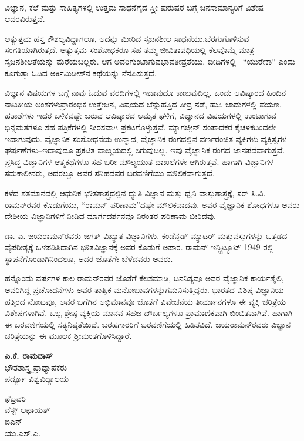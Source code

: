 \newpage

~
\thispagestyle{empty}

\vskip 1cm



\vskip 0.7cm


\noindent
ವಿಜ್ಞಾನ, ಕಲೆ ಮತ್ತು ಸಾಹಿತ್ಯಗಳಲ್ಲಿ ಉತ್ತಮ ಸಾಧನೆಗೈದ ಸ್ತ್ರೀ ಪುರುಷರ ಬಗ್ಗೆ ಜನಸಾಮಾನ್ಯರಿಗೆ ವಿಶೇಷ ಆದರವಿರುತ್ತದೆ.

ಅತ್ಯುತ್ತಮ ಹಸ್ತ ಕೌಶಲ್ಯವಿದ್ದಾಗಲೂ, ಅದನ್ನು ಮೀರಿದ ಸೃಜನಶೀಲ ಸಾಧನೆಯು,\break ಬೆರಗುಗೊಳಿಸುವ ಸಂಗತಿಯಾಗಿರುತ್ತದೆ. ಅತ್ಯುತ್ತಮ ಸಂಶೋಧಕರೂ ಸಹ ತಮ್ಮ ಜೀವಿತಾವಧಿಯಲ್ಲಿ ಕೆಲವೊಮ್ಮೆ ಮಾತ್ರ ಸೃಜನಶೀಲತೆಯನ್ನು ಮೆರೆಯಬಲ್ಲರು. ಆಗ ಅವರಿಗುಂಟಾಗುವ\break ಭಾವತೀವ್ರತೆಯು, ಬೀದಿಗಳಲ್ಲಿ ~“ಯುರೇಕಾ” ಎಂದು ಕೂಗುತ್ತಾ ಓಡಿದ ಅರ್ಕಿಮಿಡೀಸ್‍ನ ಕಥೆಯನ್ನು ನೆನಪಿಸುತ್ತದೆ.

ವಿಜ್ಞಾನ ವಿಷಯಗಳ ಬಗ್ಗೆ ನಾವು ಓದುವ ವರದಿಗಳಲ್ಲಿ ಇದಾವುದೂ ಕಾಣುವುದಿಲ್ಲ. ಒಂದು ಆವಿಷ್ಕಾರದ ಹಿಂದಿನ ನಾಟಕೀಯ ಅಂಶಗಳು\enginline{-}ಪ್ರಾರಂಭಿಕ ಉತ್ತೇಜನ, ವಿಷಯದ ಬೆನ್ನುಹತ್ತಿದ ತೀವ್ರ ನಡೆ, ಹುಸಿ ಜಾಡುಗಳಲ್ಲಿ ಪಯಣ, ಹತಾಶೆಗಳು ಇದರ ಬಳಿಕವಷ್ಟೇ ಬರುವ ಆವಿಷ್ಕಾರದ ಅಮೃತ ಘಳಿಗೆ, ವಿಜ್ಞಾನದ ವಿಷಯಗಳಲ್ಲಿ ಉಂಟಾಗುವ ಭಿನ್ನಮತಗಳೂ ಸಹ ಪತ್ರಿಕೆಗಳಲ್ಲಿ ನೀರಸವಾಗಿ ಪ್ರಕಟಗೊಳ್ಳುತ್ತವೆ. ಮ್ಯಾಗಜೀ಼ನ್ ಸಂಪಾದಕರ ಕೈಚಳಕದಿಂದಲೇ ಇದಾಗುವುದು. ವೈಜ್ಞಾನಿಕ ಸಂಶೋಧನೆಯ ಉನ್ಮಾದ, ವೈಜ್ಞಾನಿಕ ರಂಗದಲ್ಲಿನ ವರ್ಣರಂಜಿತ ವ್ಯಕ್ತಿಗಳು ವ್ಯಕ್ತಿತ್ವಗಳ ಘರ್ಷಣೆಗಳು–ಇದಾವುದೂ ಪ್ರಕಟಿತ ವಾಙ್ಮಯದಲ್ಲಿ ಸಿಗುವುದಿಲ್ಲ. ಇವು ವೈಜ್ಞಾನಿಕ ರಂಗದ ಜಾನಪದವಾಗುತ್ತವೆ. ಪ್ರಸಿದ್ಧ ವಿಜ್ಞಾನಿಗಳ ಆತ್ಮಕಥೆಗಳೂ ಸಹ ಬರೀ ಮೌಲ್ಯಯುತ ದಾಖಲೆಗಳೇ ಆಗಿರುತ್ತವೆ. ಹಾಗಾಗಿ ವಿಜ್ಞಾನಿಗಳ ಸಮಕಾಲೀನರು, ಅದರಲ್ಲೂ ಅವರ ಸನಿಹದವರ ಬರವಣಿಗೆಯು ಮೌಲಿಕವಾಗುತ್ತದೆ.

ಕಳೆದ ಶತಮಾನದಲ್ಲಿ ಆಧುನಿಕ ಭೌತಶಾಸ್ತ್ರದಲ್ಲಿನ ದ್ಯುತಿ ವಿಜ್ಞಾನ ಮತ್ತು ಧ್ವನಿ ವಾಸ್ತುಶಾಸ್ತ್ರಕ್ಕೆ, ಸರ್ ಸಿ.ವಿ. ರಾಮನ್‍ರವರ ಕೊಡುಗೆಯು, “ರಾಮನ್ ಪರಿಣಾಮ”ದಷ್ಟೇ ಮೌಲಿಕವಾದವು. ಅವರ ವೈಜ್ಞಾನಿಕ ಶೋಧಗಳೂ ಅವರು ದೇಶೀಯ ವಿಜ್ಞಾನಿಗಳಿಗೆ ನೀಡಿದ ಮಾರ್ಗದರ್ಶನವೂ ನಿರಂತರ ಪರಿಣಾಮ ಬೀರಿದವು.

ಡಾ. ಎ. ಜಯರಾಮನ್‍ರವರು ಜಗತ್ ವಿಖ್ಯಾತ ವಿಜ್ಞಾನಿಗಳು. ಕಂಡೆನ್ಸಡ್ ಮ್ಯಾಟರ್ ಮತ್ತು\break ವಸ್ತುಗಳನ್ನು ಒತ್ತಡದ ವೈಪರೀತ್ಯಕ್ಕೆ ಒಳಪಡಿಸಿದಾಗಿನ ಭೌತವಿಜ್ಞಾನಕ್ಕೆ ಅವರ ಕೊಡುಗೆ ಅಪಾರ. ರಾಮನ್ ಇನ್ಸ್ಟಿಟ್ಯೂಟ್ 1949 ರಲ್ಲಿ ಸ್ಥಾಪನೆಗೊಂಡಾಗಿನಿಂದಲೂ, ಅದರ ಜೊತೆಗೇ ಬೆಳೆದವರು ಅವರು.

\eject

ಹನ್ನೊಂದು ವರ್ಷಗಳ ಕಾಲ ರಾಮನ್‍ರವರ ಜೊತೆಗೆ ಕೆಲಸಮಾಡಿ, ದಿನನಿತ್ಯವೂ ಅವರ ವೈಜ್ಞಾನಿಕ ಕಾರ್ಯಶೈಲಿ, ಅವರಿಗಿದ್ದ ಪ್ರಚೋದನೆಗಳು ಅವರ ತಾತ್ವಿಕ ಮನೋಭಾವಗಳನ್ನು\break ಗಮನಿಸುತ್ತಿದ್ದರು. ಭಾರತದ ವಿಶಿಷ್ಠ ವಿಜ್ಞಾನಿಯ ಹತ್ತಿರದ ನೋಟವೂ, ಅವರ ಬಗೆಗಿನ ಅಭಿಮಾನವೂ ಜೊತೆಗೆ ವಿವೇಚನೆಯ ತೀರ್ಮಾನಗಳೂ ಈ ವ್ಯಕ್ತಿ ಚರಿತ್ರೆಯ ವಿಶೇಷಗಳಾಗಿವೆ. ಒಬ್ಬ ಶ್ರೇಷ್ಠ ವ್ಯಕ್ತಿಯ ಮಾನವ ಸಹಜ ದೌರ್ಬಲ್ಯಗಳೂ ಪ್ರಾಮಾಣಿಕವಾಗಿ ಬಿಂಬಿತವಾಗಿವೆ. ಹಾಗಾಗಿ ಈ ಬರವಣಿಗೆಯಲ್ಲಿ ಸತ್ಯನಿಷ್ಠತೆಯಿದೆ. ಬರಹಗಾರರಿಗೆ ಬರವಣಿಗೆಯಲ್ಲಿ ಹಿಡಿತವಿದೆ. ಜಯರಾಮನ್‍ರವರು ವಿಜ್ಞಾನ ಚರಿತ್ರೆಯನ್ನು ಈ ಮೂಲಕ ಶ‍್ರೀಮಂತಗೊಳಿಸಿದ್ದಾರೆ.

\begin{flushright}
 \textbf{ಎ.ಕೆ. ರಾಮದಾಸ್}\\
 ಭೌತಶಾಸ್ತ್ರ ಪ್ರಾಧ್ಯಾಪಕರು\\
 ಪರ್ಡ್ಯೂ ವಿಶ್ವವಿದ್ಯಾಲಯ
\end{flushright}

\begin{flushleft}
  ಫೆಬ್ರವರಿ \\
 ವೆಸ್ಟ್ ಲಫಾಯತ್\\
 ಐಎನ್ \\
 ಯು.ಎಸ್.ಎ.
\end{flushleft}

\begin{flushright}
\end{flushright}
‌  
